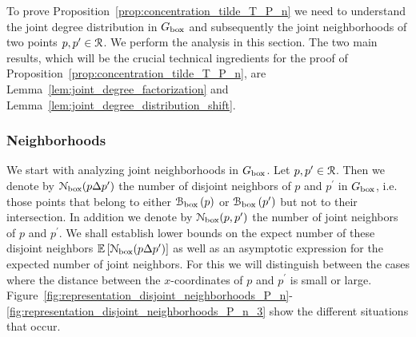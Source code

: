 To prove Proposition~\ref{prop:concentration_tilde_T_P_n} we need to understand the joint degree distribution in $G_{\text{box}}$ and subsequently the joint neighborhoods of two points $p, p^\prime \in {\mathcal R}$. We perform the analysis in this section. The two main results, which will be the crucial technical ingredients for the proof of Proposition~\ref{prop:concentration_tilde_T_P_n}, are Lemma~\ref{lem:joint_degree_factorization} and Lemma~\ref{lem:joint_degree_distribution_shift}.

\subsubsection*{Neighborhoods}

We start with analyzing joint neighborhoods in $G_{\text{box}}$. Let $p, p^\prime \in {\mathcal R}$. Then we denote by ${\mathcal N}_{\text{box}}(p\Delta p^\prime)$ the number of disjoint neighbors of $p$ and $p^\prime$ in $G_{\text{box}}$, i.e. those points that belong to either ${\mathcal B}_{\text{box}}\left(p\right)$ or ${\mathcal B}_{\text{box}}\left(p^\prime\right)$ but not to their intersection. In addition we denote by ${\mathcal N}_{\text{box}}(p,p^\prime)$ the number of joint neighbors of $p$ and $p^\prime$. We shall establish lower bounds on the expect number of these disjoint neighbors $\mathbb{E}\left[{\mathcal N}_{\text{box}}(p\Delta p^\prime)\right]$ as well as an asymptotic expression for the expected number of joint neighbors. For this we will distinguish between the cases where the distance between the $x$-coordinates of $p$ and $p^\prime$ is small or large. Figure~\ref{fig:representation_disjoint_neighborhoods_P_n}-\ref{fig:representation_disjoint_neighborhoods_P_n_3} show the different situations that occur.

